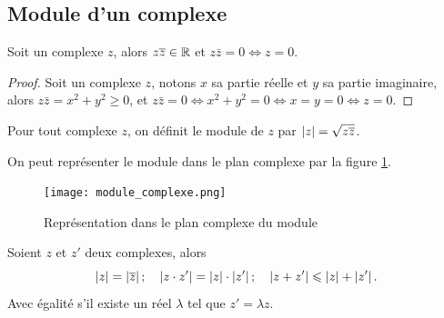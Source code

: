 \subsection{Module d'un complexe}
\label{subsec:modulecomplexe}

\begin{prop}
    Soit un complexe \(z\), alors \(z \overline{z} \in \mathbb{R}\) et \(z \bar{z} = 0 \iff z = 
    0\).
\end{prop}

\begin{proof}
    Soit un complexe \(z\), notons \(x\) sa partie réelle et \(y\) sa partie 
    imaginaire, alors \(z \bar{z} = x^2 + y^2 \geqslant 0\), et \(z \bar{z} = 0 \iff 
    x^2 + y^2 = 0 \iff x = y = 0 \iff z = 0\).
\end{proof}

\begin{defdef}
    Pour tout complexe \(z\), on définit le module de \(z\) par \(\left\lvert z\right\rvert = 
    \sqrt{z \overline{z}}\).
\end{defdef}

On peut représenter le module dans le plan complexe par la figure 
\ref{fig:moduleComplexe}.

\begin{figure}
    \centering
    \texttt{[image: module\_complexe.png]}
    \caption{Représentation dans le plan complexe du module}
    \label{fig:moduleComplexe}
\end{figure}

\begin{prop}
    Soient \(z\) et \(z'\) deux complexes, alors
    \begin{equation}
        \left\lvert z\right\rvert = \left\lvert\overline{z}\right\rvert; \quad \left\lvert z \cdot z'\right\rvert = \left\lvert z\right\rvert \cdot \left\lvert z'\right\rvert; 
        \quad \left\lvert z + z'\right\rvert\leqslant\left\lvert z\right\rvert + \left\lvert z'\right\rvert.
    \end{equation}
    Avec égalité s'il existe un réel \(\lambda\) tel que \(z' = \lambda z\).
\end{prop}

